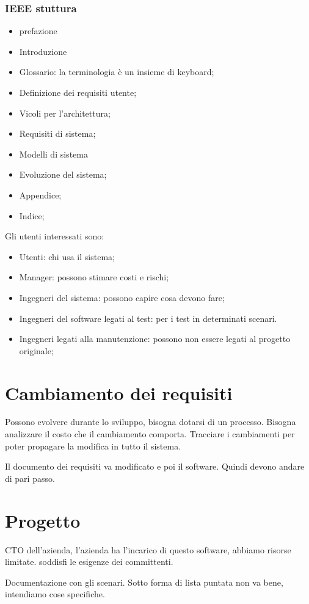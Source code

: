 \subsubsection{IEEE stuttura}
\begin{itemize}
    \item prefazione
    \item Introduzione 
    \item Glossario: la terminologia è un insieme di keyboard;
    \item Definizione dei requisiti utente;
    \item Vicoli per l'architettura;
    \item Requisiti di sistema;
    \item Modelli di sistema
    \item Evoluzione del sistema;
    \item Appendice;
    \item Indice;
\end{itemize}
Gli utenti interessati sono:
\begin{itemize}
    \item Utenti: chi usa il sistema;
    \item Manager: possono stimare costi e rischi;
    \item Ingegneri del sistema: possono capire cosa devono fare;
    \item Ingegneri del software legati al test: per i test in determinati scenari.
    \item Ingegneri legati alla manutenzione: possono non essere legati al progetto originale;
\end{itemize}
\section{Cambiamento dei requisiti}
Possono evolvere durante lo sviluppo, bisogna dotarsi di un processo. Bisogna analizzare 
il costo che il cambiamento comporta. Tracciare i cambiamenti per poter propagare
la modifica in tutto il sistema.

Il documento dei requisiti va modificato e poi il software. Quindi devono 
andare di pari passo.

\section{Progetto}
CTO dell'azienda, l'azienda ha l'incarico di questo software, abbiamo risorse limitate.
soddisfi le esigenze dei committenti.

Documentazione con gli scenari. Sotto forma di lista puntata non va bene, intendiamo 
cose specifiche.